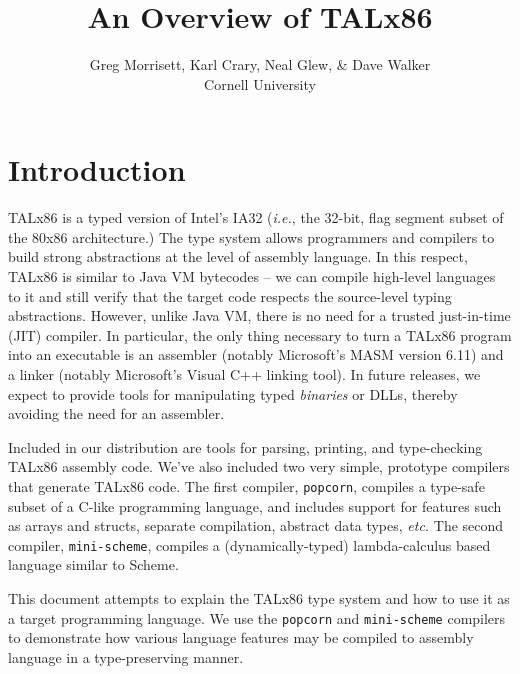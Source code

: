 \documentclass{article}
\title{An Overview of TALx86}
\author{Greg Morrisett, Karl Crary, Neal Glew, \& Dave Walker \\
	Cornell University}
\begin{document}
\maketitle
\section{Introduction}

TALx86 is a typed version of Intel's IA32 ({\em i.e.}, the 32-bit,
flag segment subset of the 80x86 architecture.)  The type system
allows programmers and compilers to build strong abstractions at the
level of assembly language.  In this respect, TALx86 is similar to
Java VM bytecodes -- we can compile high-level languages to it
and still verify that the target code respects the source-level
typing abstractions.  However, unlike Java VM, there is no need
for a trusted just-in-time (JIT) compiler.  In particular, the
only thing necessary to turn a TALx86 program into an executable
is an assembler (notably Microsoft's MASM version 6.11) and a linker
(notably Microsoft's Visual C++ linking tool).  In future
releases, we expect to provide tools for manipulating typed
{\em binaries} or DLLs, thereby avoiding the need for an assembler.

Included in our distribution are tools for parsing, printing, and
type-checking TALx86 assembly code.  We've also included two very
simple, prototype compilers that generate TALx86 code.  The first
compiler, {\tt popcorn}, compiles a type-safe subset of a C-like
programming language, and includes support for features such as arrays
and structs, separate compilation, abstract data types, {\em etc.}
The second compiler, {\tt mini-scheme}, compiles a (dynamically-typed)
lambda-calculus based language similar to Scheme.

This document attempts to explain the TALx86 type system and how
to use it as a target programming language.  We use the {\tt popcorn}
and {\tt mini-scheme} compilers to demonstrate how various language
features may be compiled to assembly language in a type-preserving
manner.
\end{document}
